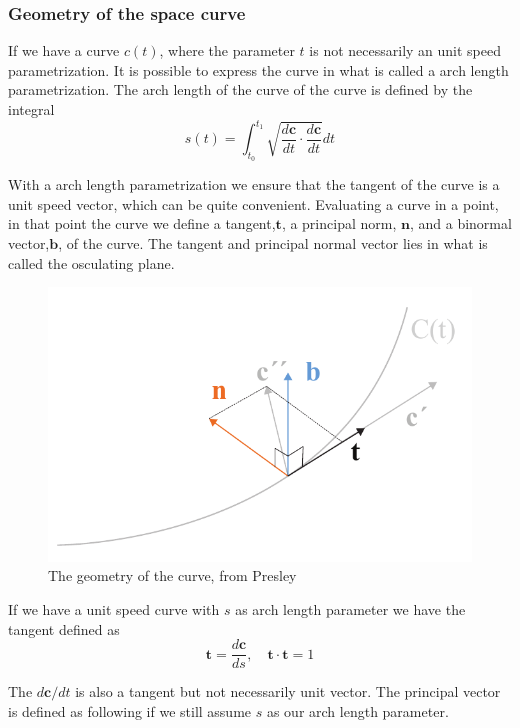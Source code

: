 \subsubsection{Geometry of the space curve} \label{GeoSpaceCurve}

If we have a curve $c(t)$, where the parameter $t$ is not necessarily an unit speed parametrization. It is possible to express the curve in what is called a arch length parametrization. The arch length of the curve of the curve is defined by the integral
\begin{equation}
s(t) = \int_{t_0}^{t_1} \sqrt{\frac{d\textbf{c}}{dt} \cdot \frac{d\textbf{c}}{dt}}dt
\end{equation}

With a arch length parametrization we ensure that the tangent of the curve is a unit speed vector, which can be quite convenient.
Evaluating a curve in a point, in that point the curve we define a tangent,$\textbf{t}$, a principal norm, $\textbf{n}$, and a binormal vector,$\textbf{b}$, of the curve. The tangent and principal normal vector lies in what is called the osculating plane.

\begin{figure}[H]
\centering
\includegraphics[width=0.7\linewidth ]{figure/Theory/CurveGeometry.pdf}              
\caption{The geometry of the curve, from Presley }
\end{figure}

If we have a unit speed curve with $s$ as arch length parameter we have the tangent defined as 
\begin{equation}
\textbf{t} =  \frac{d\textbf{c}}{ds} ,\quad \textbf{t} \cdot \textbf{t} = 1
\end{equation}

The $d\textbf{c}/dt$ is also a tangent but not necessarily unit vector. The principal vector is defined as following if we still assume $s$ as our arch length parameter.

